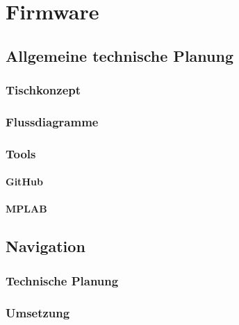 \chapter{Firmware}
\renewcommand{\kapitelautor}{Autor: Lucas Ullrich}

\section{Allgemeine technische Planung}

  \subsection{Tischkonzept}

  \subsection{Flussdiagramme}

  \subsection{Tools}

    \subsubsection{GitHub}

    \subsubsection{MPLAB}

\section{Navigation}

  \subsection{Technische Planung}

  \subsection{Umsetzung}

